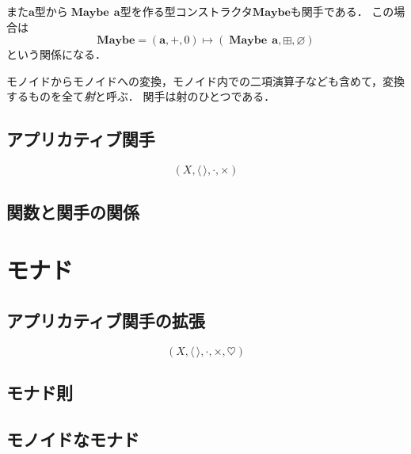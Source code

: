 \documentclass[twocolumn]{jsbook}
\newcommand{\keyword}[1]{\emph{#1}}
\newcommand{\typename}[1]{\mathbf{#1}}
\newcommand{\typeconstructor}[2]{\mathop{#1}\,#2}
\newcommand{\typemaybe}{\typename{Maybe}}
\newcommand{\constantnothing}{\varnothing}
\newcommand{\binaryfunctormap}{\cdot}
\newcommand{\binarymaybeappend}{\boxplus}
\begin{document}
また$\typename{a}$型から$\typeconstructor{\typemaybe}{\typename{a}}$型を作る型コンストラクタ$\typemaybe$も関手である．
この場合は$$\typemaybe=(\typename{a},+,0)\mapsto(\typeconstructor{\typemaybe}{\typename{a}},\binarymaybeappend,\constantnothing)$$という関係になる．


モノイドからモノイドへの変換，モノイド内での二項演算子なども含めて，変換するものを全て\keyword{射}と呼ぶ．
関手は射のひとつである．



\section{アプリカティブ関手}



$$(X,\langle\,\rangle,\binaryfunctormap,\times)$$


\section{関数と関手の関係}

\chapter{モナド}

\section{アプリカティブ関手の拡張}

$$(X,\langle\,\rangle,\binaryfunctormap,\times,\heartsuit)$$


\section{モナド則}

\section{モノイドなモナド}
\end{document}

